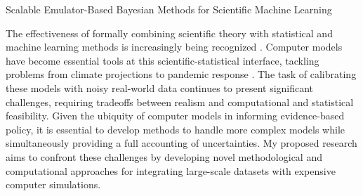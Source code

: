 \documentclass[11pt]{article}
\begin{document}
\begin{center}
Scalable Emulator-Based Bayesian Methods for Scientific Machine Learning
\end{center}

The effectiveness of formally combining scientific theory with statistical and machine learning methods is increasingly being recognized \cite{Willcox, Laubmeier, Wikle}. 
 Computer models have become essential tools at this scientific-statistical interface, tackling problems from 
climate projections \cite{Canadell} to pandemic response \cite{Swallow}. The task of calibrating these models with noisy real-world data continues to present
significant challenges, requiring tradeoffs between realism and computational and statistical feasibility. Given the ubiquity of computer models in informing
 evidence-based policy, it is essential to develop methods to handle more complex models while simultaneously providing a full accounting of uncertainties.
 My proposed research aims to confront these challenges by developing novel methodological and computational approaches for integrating large-scale datasets with expensive computer simulations. 
\end{document}
